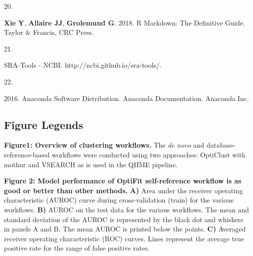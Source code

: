 \documentclass[
]{article}
\newlength{\cslhangindent}
\newlength{\csllabelwidth}
\newlength{\cslentryspacingunit} %
\newenvironment{CSLReferences}[2] %
 {%
  \setlength{\parindent}{0pt}
  \ifodd #1
  \let\oldpar\par
  \def\par{\hangindent=\cslhangindent\oldpar}
  \fi
  \setlength{\parskip}{#2\cslentryspacingunit}
 }%
 {}
\newcommand{\CSLLeftMargin}[1]{\parbox[t]{\csllabelwidth}{#1}}
\newcommand{\CSLRightInline}[1]{\parbox[t]{\linewidth - \csllabelwidth}{#1}\break}
\begin{document}
\begin{CSLReferences}{0}{1}
\leavevmode{}%
\CSLLeftMargin{20. }%
\CSLRightInline{\textbf{Xie Y}, \textbf{Allaire JJ}, \textbf{Grolemund
G}. 2018. R {Markdown}: {The Definitive Guide}. {Taylor \& Francis, CRC
Press}.}

\leavevmode{}%
\CSLLeftMargin{21. }%
\CSLRightInline{{SRA}-{Tools} - {NCBI}.
http://ncbi.github.io/sra-tools/.}

\leavevmode{}%
\CSLLeftMargin{22. }%
\CSLRightInline{2016. Anaconda {Software Distribution}. Anaconda
Documentation. Anaconda Inc.}

\end{CSLReferences}

\setlength{\parindent}{0in}
\setlength{\leftskip}{0in}

\newpage

\hypertarget{figure-legends}{%
\subsection{Figure Legends}\label{figure-legends}}

\textbf{Figure1: Overview of clustering workflows.} The \emph{de novo}
and database-reference-based workflows were conducted using two
approaches: OptiClust with mothur and VSEARCH as is used in the QIIME
pipeline.

\textbf{Figure 2: Model performance of OptiFit self-reference workflow
is as good or better than other methods.} \textbf{A)} Area under the
receiver operating characteristic (AUROC) curve during cross-validation
(train) for the various workflows. \textbf{B)} AUROC on the test data
for the various workflows. The mean and standard deviation of the AUROC
is represented by the black dot and whiskers in panels A and B. The mean
AUROC is printed below the points. \textbf{C)} Averaged receiver
operating characteristic (ROC) curves. Lines represent the average true
positive rate for the range of false positive rates.
\end{document}
